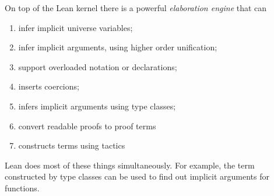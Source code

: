 \documentclass[12pt]{amsart}  %
\begin{document}
On top of the Lean kernel there is a powerful \emph{elaboration engine} that can
\begin{enumerate}
\item infer implicit universe variables;
\item infer implicit arguments, using higher order unification;
\item support overloaded notation or declarations;
\item inserts coercions;
\item infers implicit arguments using type classes;
\item convert readable proofs to proof terms
\item constructs terms using tactics
\end{enumerate}
Lean does most of these things simultaneously. For example, the term constructed by
type classes can be used to find out implicit arguments for functions.
\end{document}
